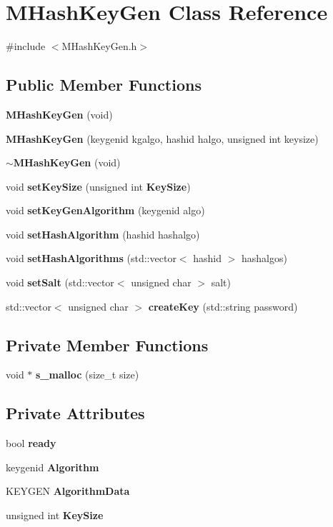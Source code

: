 \section{M\+Hash\+Key\+Gen Class Reference}
\label{classMHashKeyGen}


{\ttfamily \#include $<$M\+Hash\+Key\+Gen.\+h$>$}

\subsection*{Public Member Functions}
\begin{DoxyCompactItemize}
\item 
\textbf{ M\+Hash\+Key\+Gen} (void)
\item 
\textbf{ M\+Hash\+Key\+Gen} (keygenid kgalgo, hashid halgo, unsigned int keysize)
\item 
\textbf{ $\sim$\+M\+Hash\+Key\+Gen} (void)
\item 
void \textbf{ set\+Key\+Size} (unsigned int \textbf{ Key\+Size})
\item 
void \textbf{ set\+Key\+Gen\+Algorithm} (keygenid algo)
\item 
void \textbf{ set\+Hash\+Algorithm} (hashid hashalgo)
\item 
void \textbf{ set\+Hash\+Algorithms} (std\+::vector$<$ hashid $>$ hashalgos)
\item 
void \textbf{ set\+Salt} (std\+::vector$<$ unsigned char $>$ salt)
\item 
std\+::vector$<$ unsigned char $>$ \textbf{ create\+Key} (std\+::string password)
\end{DoxyCompactItemize}
\subsection*{Private Member Functions}
\begin{DoxyCompactItemize}
\item 
void $\ast$ \textbf{ s\+\_\+malloc} (size\+\_\+t size)
\end{DoxyCompactItemize}
\subsection*{Private Attributes}
\begin{DoxyCompactItemize}
\item 
bool \textbf{ ready}
\item 
keygenid \textbf{ Algorithm}
\item 
K\+E\+Y\+G\+EN \textbf{ Algorithm\+Data}
\item 
unsigned int \textbf{ Key\+Size}
\end{DoxyCompactItemize}


